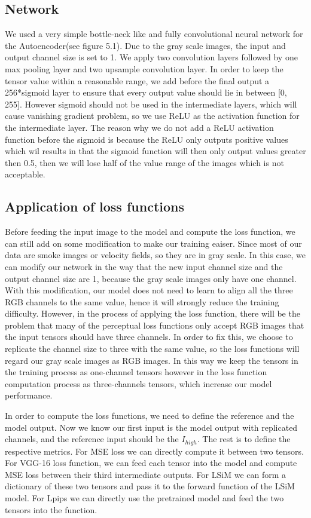 \documentclass[a4paper,12pt,twoside]{report}
\begin{document}
\subsection{Network}
We used a very simple bottle-neck like and fully convolutional neural network for the Autoencoder(see figure 5.1). Due to the gray scale images, the input and output channel size is set to 1. We apply two convolution layers followed by one max pooling layer and two upsample convolution layer. In order to keep the tensor value within a reasonable range, we add before the final output a 256*sigmoid layer to ensure that every output value should lie in between [0, 255]. However sigmoid should not be used in the intermediate layers, which will cause vanishing gradient problem, so we use ReLU as the activation function for the intermediate layer. The reason why we do not add a ReLU activation function before the sigmoid is because the ReLU only outputs positive values which wil results in that the sigmoid function will then only output values greater then 0.5, then we will lose half of the value range of the images which is not acceptable.
\subsection{Application of loss functions}
Before feeding the input image to the model and compute the loss function, we can still add on some modification to make our training eaiser. Since most of our data are smoke images or velocity fields, so they are in gray scale. In this case, we can modify our network in the way that the new input channel size and the output channel size are 1, because the gray scale images only have one channel. With this modification, our model does not need to learn to align all the three RGB channels to the same value, hence it will strongly reduce the training difficulty. However, in the process of applying the loss function, there will be the problem that many of the perceptual loss functions only accept RGB images that the input tensors should have three channels. In order to fix this, we choose to replicate the channel size to three with the same value, so the loss functions will regard our gray scale images as RGB images. In this way we keep the tensors in the training process as one-channel tensors however in the loss function computation process as three-channels tensors, which increase our model performance.

In order to compute the loss functions, we need to define the reference and the model output. Now we know our first input is the model output with replicated channels, and the reference input should be the $I_{high}$. The rest is to define the respective metrics. For MSE loss we can directly compute it between two tensors. For VGG-16 loss function, we can feed each tensor into the model and compute MSE loss between their third intermediate outputs. For LSiM we can form a dictionary of these two tensors and pass it to the forward function of the LSiM model. For Lpips we can directly use the pretrained model and feed the two tensors into the function.
\end{document}

